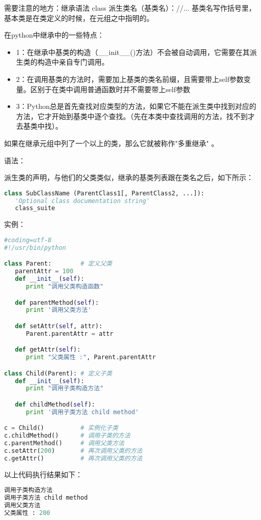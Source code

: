 需要注意的地方：继承语法 class 派生类名（基类名）：//... 基类名写作括号里，基本类是在类定义的时候，在元组之中指明的。

在python中继承中的一些特点：
\begin{itemize}
\item 1：在继承中基类的构造（\_\_init\_\_()方法）不会被自动调用，它需要在其派生类的构造中亲自专门调用。
\item 2：在调用基类的方法时，需要加上基类的类名前缀，且需要带上self参数变量。区别于在类中调用普通函数时并不需要带上self参数
\item 3：Python总是首先查找对应类型的方法，如果它不能在派生类中找到对应的方法，它才开始到基类中逐个查找。（先在本类中查找调用的方法，找不到才去基类中找）。
\end{itemize}
如果在继承元组中列了一个以上的类，那么它就被称作"多重继承" 。

语法：

派生类的声明，与他们的父类类似，继承的基类列表跟在类名之后，如下所示：
\begin{lstlisting}[language=Python]
class SubClassName (ParentClass1[, ParentClass2, ...]):
   'Optional class documentation string'
   class_suite
\end{lstlisting}

实例：

\begin{lstlisting}[language=Python]
#coding=utf-8
#!/usr/bin/python

class Parent:        # 定义父类
   parentAttr = 100
   def __init__(self):
      print "调用父类构造函数"

   def parentMethod(self):
      print '调用父类方法'

   def setAttr(self, attr):
      Parent.parentAttr = attr

   def getAttr(self):
      print "父类属性 :", Parent.parentAttr

class Child(Parent): # 定义子类
   def __init__(self):
      print "调用子类构造方法"

   def childMethod(self):
      print '调用子类方法 child method'

c = Child()          # 实例化子类
c.childMethod()      # 调用子类的方法
c.parentMethod()     # 调用父类方法
c.setAttr(200)       # 再次调用父类的方法
c.getAttr()          # 再次调用父类的方法
\end{lstlisting}

以上代码执行结果如下：
\begin{lstlisting}[language=Python]
调用子类构造方法
调用子类方法 child method
调用父类方法
父类属性 : 200
\end{lstlisting}

